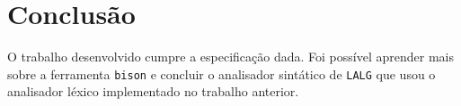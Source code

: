 \section{Conclusão \label{sec:conclusao}}

O trabalho desenvolvido cumpre a especificação dada. Foi possível aprender mais sobre a ferramenta \texttt{bison} e concluir o analisador sintático de \texttt{LALG} que usou o analisador léxico implementado no trabalho anterior.
